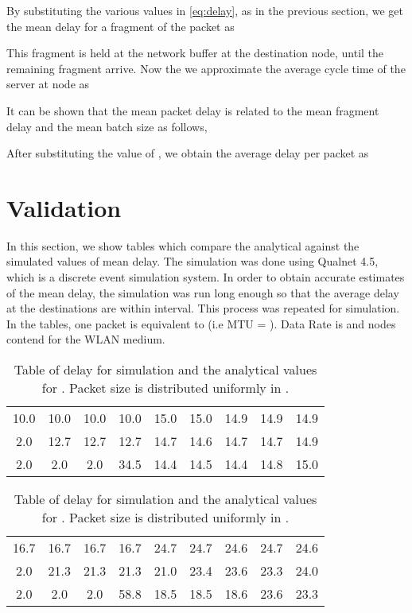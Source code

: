 \documentclass[10pt, conference, compsocconf]{IEEEtran}
\begin{document}
By substituting the various values in \eqref{eq:delay}, as in the previous section, we get the mean delay for a fragment of the packet as 

This fragment is held at the network buffer at the destination node, until the remaining fragment arrive. Now the we approximate the average cycle time of the server at node  as

It can be shown that the mean packet delay is related to the mean fragment delay and the mean batch size as follows,

After substituting the value of , we obtain the average delay per packet as


\section{\large{Validation}}
\label{sim}
In this section, we show tables which compare the analytical against the simulated values of mean delay. The simulation was done using Qualnet 4.5, which is a discrete event simulation system. In order to obtain accurate estimates of the mean delay, the simulation was run long enough so that the average delay at the destinations are within  interval. This process was repeated for  simulation. In the tables, one packet is equivalent to  (i.e MTU =  ). Data Rate is  and   nodes contend for the WLAN medium.

\begin{table}[!h]
\caption{Table of delay for simulation and the analytical values for . Packet size is distributed uniformly in .  }
\begin{center}
\begin{tabular}{|c|c|c|c|c|c|c|c|c|}
\hline  &  &  &  &  &  &  &  &   \\ 
\hline 10.0 & 10.0 & 10.0 & 10.0 & 15.0 & 15.0 & 14.9 & 14.9 & 14.9 \\ 
\hline 2.0 & 12.7 & 12.7 & 12.7 & 14.7 & 14.6 & 14.7 & 14.7 & 14.9 \\ 
\hline 2.0 & 2.0 & 2.0 & 34.5 & 14.4 & 14.5 & 14.4 & 14.8 &  15.0\\ 
\hline
\end{tabular} 
\end{center}
\label{table1}
\end{table}

\begin{table}[!h]
\caption{Table of delay for simulation and the analytical values for . Packet size is distributed uniformly in .  }
\begin{center}
\begin{tabular}{|c|c|c|c|c|c|c|c|c|}
\hline  &  &  &  &  &  &  &  &   \\ 
\hline 16.7 & 16.7 & 16.7 & 16.7 & 24.7 & 24.7 & 24.6 & 24.7 & 24.6 \\ 
\hline  2.0 & 21.3 & 21.3 & 21.3 & 21.0 & 23.4 & 23.6 & 23.3 & 24.0 \\ 
\hline  2.0 & 2.0 & 2.0 & 58.8 & 18.5 & 18.5 & 18.6 & 23.6 & 23.3 \\ 
\hline 
\end{tabular} 
\end{center}
\label{table2}
\end{table}
\end{document}
